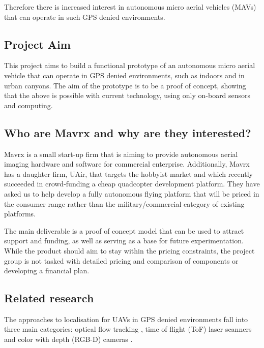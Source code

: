 \documentclass[]{article}
\begin{document}
{Therefore there is increased interest in autonomous micro aerial vehicles (MAVs) that can operate in such GPS denied environments.


\subsection{Project Aim}
\label{sub:what_are_we_trying_to_achieve}
This project aims to build a functional prototype of an autonomous micro aerial vehicle that can operate in GPS denied environments, such as indoors and in urban canyons. The aim of the prototype is to be a proof of concept, showing that the above is possible with current technology, using only on-board sensors and computing. 

\subsection{Who are Mavrx and why are they interested?} %
\label{sub:why_are_mavrx_interested_in_this_work_}

Mavrx is a small start-up firm that is aiming to provide autonomous aerial imaging hardware and software for commercial enterprise. Additionally, Mavrx has a daughter firm, UAir, that targets the hobbyist market and which recently succeeded in crowd-funding a cheap quadcopter development platform. They have asked us to help develop a fully autonomous flying platform that will be priced in the consumer range rather than the military/commercial category of existing platforms. 

The main deliverable is a proof of concept model that can be used to attract support and funding, as well as serving as a base for future experimentation. While the product should aim to stay within the pricing constraints, the project group is not tasked with detailed pricing and comparison of components or developing a financial plan.

\subsection{Related research} %
\label{sub:related_works}
The approaches to localisation for UAVs in GPS denied environments fall into three main categories: optical flow tracking \cite{DBLP:conf/icra/GrabeBG12}, time of flight (ToF) laser scanners \cite{Bry2012} and color with depth (RGB-D) cameras \cite{Shen2012}.

}
\end{document}
